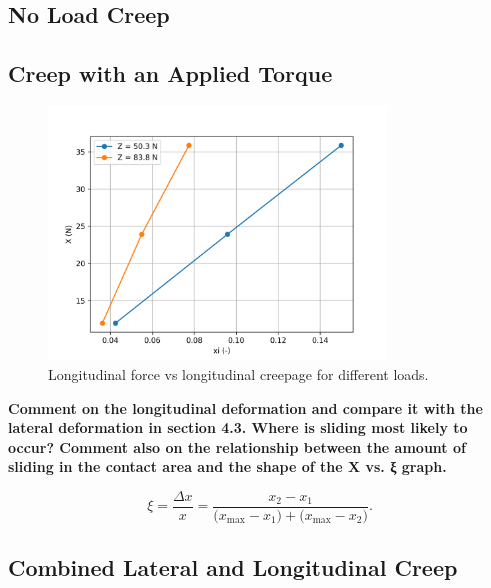 \documentclass{article}
\begin{document}
\subsection{\textbf{No Load Creep}}

\subsection{\textbf{Creep with an Applied Torque}}

\begin{figure}[H]
    \centering
    \includegraphics[width=0.8\textwidth]{52.png}
    \caption{Longitudinal force vs longitudinal creepage for different loads.}
    \label{fig:lateral_force_vs_longitudinal_force}
\end{figure}

\begin{center}
    \textbf{ Comment on the longitudinal deformation and compare it with the lateral deformation
    in section 4.3. Where is sliding most likely to occur? Comment also on the
    relationship between the amount of sliding in the contact area and the shape of the X
    vs.
    ξ graph.}
\end{center}

\begin{equation}
    \xi = \frac{\Delta x}{x} 
     = \frac{x_{2} - x_{1}}
            {\bigl(x_{\max} - x_{1}\bigr) + \bigl(x_{\max} - x_{2}\bigr)}.
\end{equation}

\subsection{\textbf{Combined Lateral and Longitudinal Creep}}
\end{document}
